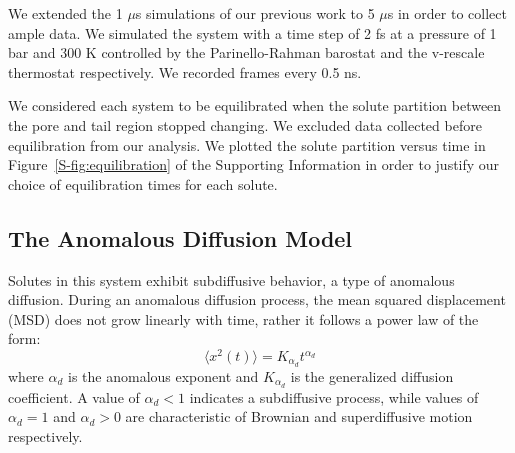 \documentclass{article}
\begin{document}
  We extended the 1 $\mu$s simulations of our previous work to 5 $\mu$s in order
  to collect ample data. We simulated the system with a time step of 2 fs at a pressure
  of 1 bar and 300 K controlled by the Parinello-Rahman barostat and the v-rescale 
  thermostat respectively. We recorded frames every 0.5 ns.
  
  We considered each system to be equilibrated when the solute partition between the 
  pore and tail region stopped changing. We excluded data collected before equilibration
  from our analysis. We plotted the solute partition versus time in Figure~\ref{S-fig:equilibration}
  of the Supporting Information in order to justify our choice of equilibration times
  for each solute.

  \subsection{The Anomalous Diffusion Model}\label{method:model_sFBM}

  Solutes in this system exhibit subdiffusive behavior, a type of anomalous diffusion.
  During an anomalous diffusion process, the mean squared displacement (MSD)
  does not grow linearly with time, rather it follows a power law of the form:
  \begin{equation} 
  \langle x^2(t) \rangle = K_{\alpha_d}t^{\alpha_d}
  \label{eqn:msd_form}
  \end{equation} 
  where $\alpha_d$ is the anomalous exponent and $K_{\alpha_d}$ is the generalized 
  diffusion coefficient. A value of $\alpha_d < 1$ indicates a subdiffusive process, 
  while values of $\alpha_d = 1$ and $\alpha_d > 0$ are characteristic of Brownian and
  superdiffusive motion respectively.


  
\end{document}
